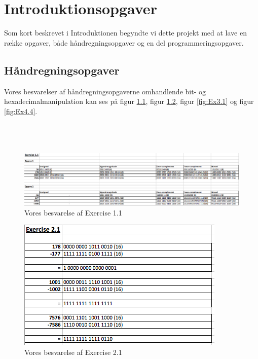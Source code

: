 \chapter{Introduktionsopgaver}
Som kort beskrevet i Introduktionen begyndte vi dette projekt med at lave en række opgaver, både håndregningsopgaver og en del programmeringsopgaver.

\section{Håndregningsopgaver}
Vores besvarelser af håndregningsopgaverne omhandlende bit- og hexadecimalmanipulation kan ses på figur \ref{fig:Ex1.1}, figur \ref{fig:Ex2.1}, figur \ref{fig:Ex3.1} og figur \ref{fig:Ex4.4}.\\ \\ \\ \\

\begin{figure}[h!]
\centering
\includegraphics[scale=0.4]{figs/Ex1.png}
\caption{Vores besvarelse af Exercise 1.1}
\label{fig:Ex1.1}
\end{figure}

\begin{figure}[h!]
\centering
\includegraphics[scale=0.6]{figs/Ex2.png}
\caption{Vores besvarelse af Exercise 2.1}
\label{fig:Ex2.1}
\end{figure}


